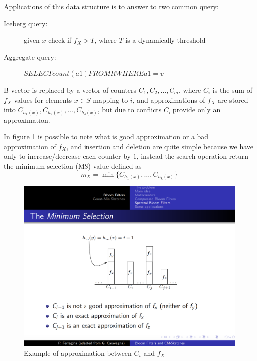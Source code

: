     Applications of this data structure is to answer to two common query:
    \begin{description}
        \item [Iceberg query: ] given $x$ check if $f_X > T$, where $T$ is a dynamically threshold
	\item [Aggregate query: ] $SELECT count(a1) FROM R WHERE a1 = v$
    \end{description}
    B vector is replaced by a vector of counters $C_1, C_2, \dots, C_m$, where $C_i$ is the sum of $f_X$ values for elements $x \in S$ mapping to $i$, and approximations of $f_X$ are stored 
    into $C_{h_1(x)}, C_{h_2(x)}, \dots, C_{h_k(x)}$, but due to conflicts $C_i$ provide only an approximation.

    In figure \ref{img:approximation} is possible to note what is good approximation or a bad approximation of $f_X$, and insertion and deletion are quite simple because we have only
    to increase/decrease each counter by $1$, instead the search operation return the minimum selection (MS) value defined as 
    \[ m_X = \min \{C_{h_1(x)}, \dots, C_{h_k(x)}\} \]

    \begin{figure}
	\caption{Example of approximation between $C_i$ and $f_X$}
	\label{img:approximation}
	\includegraphics[width=\textwidth]{Images/approximation}
    \end{figure}

